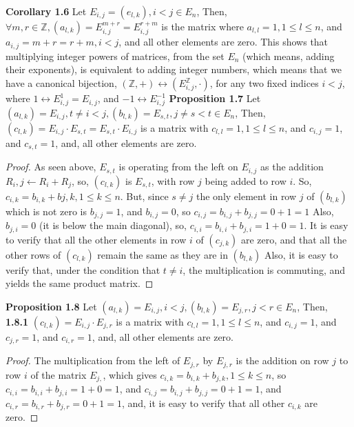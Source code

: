 \documentclass[12pt]{article}
\begin{document}
\textbf{Corollary 1.6} 
Let $E_{i,j}=(e_{l,k}),i<j \in E_n$, Then,\newline
$\forall m,r \in \mathbb{Z},
(a_{l,k})=E_{i,j}^{m+r}=E_{i,j}^{r+m}$ is the matrix where $a_{l,l}=1,1 \leq l \leq n$, and $a_{i,j}=m+r=r+m,i<j$, and all other elements are zero. \newline
This shows that multiplying integer powers of matrices, from the set $E_n$ (which means, adding their exponents), is equivalent to adding integer numbers, which means that we have a canonical bijection, $(\mathbb{Z},+) \leftrightarrow (E_{i,j}^{\mathbb{Z}},\cdot)$, for any two fixed indices $i<j$, where $1 \leftrightarrow E_{i,j}^1=E_{i,j}$, and $-1 \leftrightarrow E_{i,j}^{-1}$ \newline 
\newpage
\textbf{Proposition 1.7} \newline
Let $(a_{l,k})=E_{i,j},t \neq i<j,(b_{l,k})=E_{s,t},j \neq s<t \in E_n$, Then, \newline
$(c_{l,k})=E_{i,j} \cdot E_{s,t}=E_{s,t} \cdot E_{i,j}$ is a matrix with $c_{l,l}=1,1 \leq l \leq n$, and $c_{i,j}=1$, and $c_{s,t}=1$, and, all other elements are zero.
\begin{proof}
As seen above, $E_{s,t}$ is operating from the left on $E_{i,j}$ as the addition $R_i,j \leftarrow R_i+R_j$, so, $(c_{l,k})$ is $E_{s,t}$, with row $j$ being added to row $i$. \newline
So, $c_{i,k}=b_{i,k}+b{j,k},1 \leq k \leq n$. But, since $s \neq j$ the only element in row $j$ of $(b_{l,k})$ which is not zero is $b_{j,j}=1$, and $b_{i,j}=0$, so $c_{i,j}=b_{i,j}+b_{j,j}=0+1=1$ \newline
Also, $b_{j,i}=0$ (it is below the main diagonal), so, $c_{i,i}=b_{i,i}+b_{j,i}=1+0=1$. \newline
It is easy to verify that all the other elements in row $i$ of $(c_{j,k})$ are zero, and that all the other rows of $(c_{l,k})$ remain the same as they are in $(b_{l,k})$ \newline
Also, it is easy to verify that, under the condition that $t \neq i$, the multiplication is commuting, and yields the same product matrix. 
\end{proof}
\textbf{Proposition 1.8} \newline
Let $(a_{l,k})=E_{i,j},i<j,(b_{l,k})=E_{j,r},j<r \in E_n$, Then, \newline
\textbf{1.8.1} $(c_{l,k})=E_{i,j} \cdot E_{j,r}$ is a matrix with $c_{l,l}=1,1 \leq l \leq n$, and $c_{i,j}=1$, and $c_{j,r}=1$, and $c_{i,r}=1$, and, all other elements are zero.
\begin{proof}
The multiplication from the left of $E_{j,r}$ by $E_{j,r}$ is the addition on row $j$ to row $i$ of the matrix $E_{j,}$, which gives $c_{i,k}=b_{i,k}+b_{j,k},1 \leq k \leq n$, so $c_{i,i}=b_{i,i}+b_{j,i}=1+0=1$, and $c_{i,j}=b_{i,j}+b_{j,j}=0+1=1$, and $c_{i,r}=b_{i,r}+b_{j,r}=0+1=1$, and, it is easy to verify that all other $c_{i,k}$ are zero. \newline
\end{proof}
\end{document}
